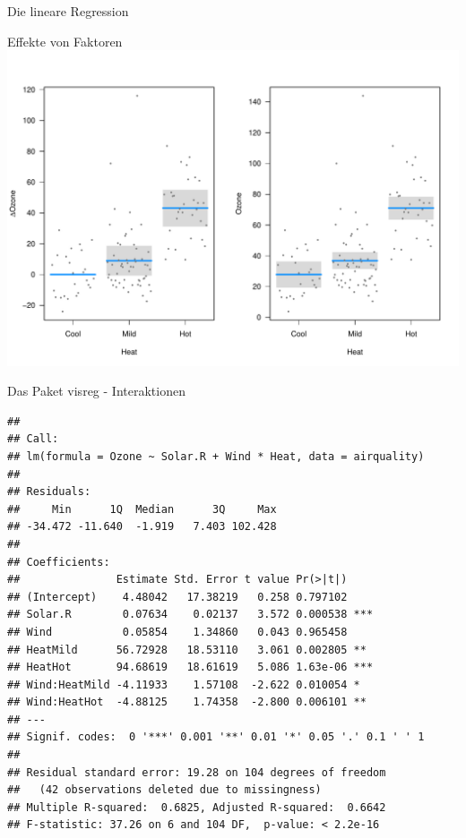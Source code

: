 \documentclass[ignorenonframetext,]{beamer}
\newenvironment{Shaded}{}{}
\newcommand{\KeywordTok}[1]{\textcolor[rgb]{0.00,0.44,0.13}{\textbf{{#1}}}}
\newcommand{\DataTypeTok}[1]{\textcolor[rgb]{0.56,0.13,0.00}{{#1}}}
\newcommand{\DecValTok}[1]{\textcolor[rgb]{0.25,0.63,0.44}{{#1}}}
\newcommand{\StringTok}[1]{\textcolor[rgb]{0.25,0.44,0.63}{{#1}}}
\newcommand{\NormalTok}[1]{{#1}}
\begin{document}
\begin{frame}[fragile]{Die lineare Regression}
\begin{block}{Effekte von Faktoren}
\includegraphics{R_intern_files/figure-beamer/unnamed-chunk-309-1.pdf}

\end{block}

\begin{block}{Das Paket visreg - Interaktionen}

\begin{Shaded}
\end{Shaded}

\begin{verbatim}
## 
## Call:
## lm(formula = Ozone ~ Solar.R + Wind * Heat, data = airquality)
## 
## Residuals:
##     Min      1Q  Median      3Q     Max 
## -34.472 -11.640  -1.919   7.403 102.428 
## 
## Coefficients:
##               Estimate Std. Error t value Pr(>|t|)    
## (Intercept)    4.48042   17.38219   0.258 0.797102    
## Solar.R        0.07634    0.02137   3.572 0.000538 ***
## Wind           0.05854    1.34860   0.043 0.965458    
## HeatMild      56.72928   18.53110   3.061 0.002805 ** 
## HeatHot       94.68619   18.61619   5.086 1.63e-06 ***
## Wind:HeatMild -4.11933    1.57108  -2.622 0.010054 *  
## Wind:HeatHot  -4.88125    1.74358  -2.800 0.006101 ** 
## ---
## Signif. codes:  0 '***' 0.001 '**' 0.01 '*' 0.05 '.' 0.1 ' ' 1
## 
## Residual standard error: 19.28 on 104 degrees of freedom
##   (42 observations deleted due to missingness)
## Multiple R-squared:  0.6825, Adjusted R-squared:  0.6642 
## F-statistic: 37.26 on 6 and 104 DF,  p-value: < 2.2e-16
\end{verbatim}


\end{block}
\end{frame}
\end{document}
